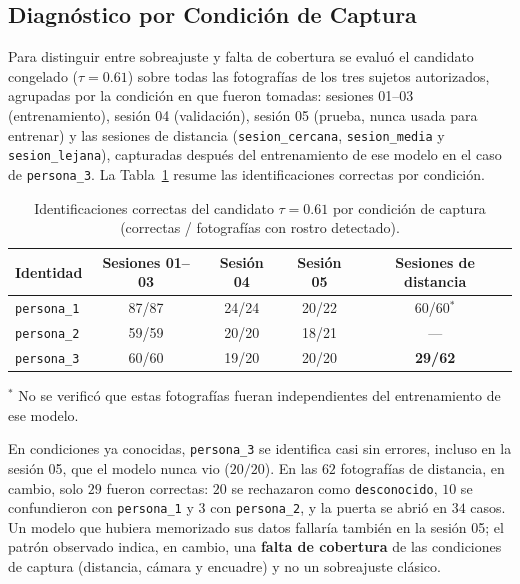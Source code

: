 \documentclass{article}
\begin{document}
\subsection{Diagnóstico por Condición de Captura}
Para distinguir entre sobreajuste y falta de cobertura se evaluó el candidato congelado ($\tau = 0.61$) sobre todas las fotografías de los tres sujetos autorizados, agrupadas por la condición en que fueron tomadas: sesiones 01--03 (entrenamiento), sesión 04 (validación), sesión 05 (prueba, nunca usada para entrenar) y las sesiones de distancia (\texttt{sesion\_cercana}, \texttt{sesion\_media} y \texttt{sesion\_lejana}), capturadas después del entrenamiento de ese modelo en el caso de \texttt{persona\_3}. La Tabla~\ref{tab:diagnostico-persona3} resume las identificaciones correctas por condición.

\begin{table}[H]
\centering
\caption{Identificaciones correctas del candidato $\tau = 0.61$ por condición de captura (correctas / fotografías con rostro detectado).}
\label{tab:diagnostico-persona3}
\begin{tabular}{lcccc}
\toprule
Identidad & Sesiones 01--03 & Sesión 04 & Sesión 05 & Sesiones de distancia \\
\midrule
\texttt{persona\_1} & 87/87 & 24/24 & 20/22 & 60/60$^{*}$ \\
\texttt{persona\_2} & 59/59 & 20/20 & 18/21 & --- \\
\texttt{persona\_3} & 60/60 & 19/20 & 20/20 & \textbf{29/62} \\
\bottomrule
\end{tabular}

\smallskip
{\footnotesize $^{*}$ No se verificó que estas fotografías fueran independientes del entrenamiento de ese modelo.}
\end{table}

En condiciones ya conocidas, \texttt{persona\_3} se identifica casi sin errores, incluso en la sesión 05, que el modelo nunca vio ($20/20$). En las $62$ fotografías de distancia, en cambio, solo $29$ fueron correctas: $20$ se rechazaron como \texttt{desconocido}, $10$ se confundieron con \texttt{persona\_1} y $3$ con \texttt{persona\_2}, y la puerta se abrió en $34$ casos. Un modelo que hubiera memorizado sus datos fallaría también en la sesión 05; el patrón observado indica, en cambio, una \textbf{falta de cobertura} de las condiciones de captura (distancia, cámara y encuadre) y no un sobreajuste clásico.
\end{document}

